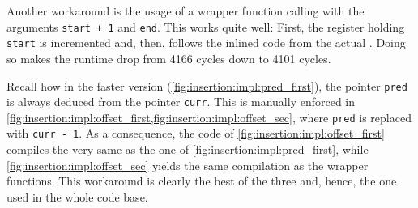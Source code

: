 Another workaround is the usage of a wrapper function calling \IS{} with the arguments \lstinline|start + 1| and \lstinline|end|.
This works quite well:
First, the register holding \lstinline|start| is incremented and, then, follows the inlined code from the actual \IS{}.
Doing so makes the runtime drop from 4166 cycles down to 4101 cycles.

Recall how in the faster version (\cref{fig:insertion:impl:pred_first}), the pointer \lstinline|pred| is always deduced from the pointer \lstinline|curr|.
This is manually enforced in \cref{fig:insertion:impl:offset_first,fig:insertion:impl:offset_sec}, where \lstinline|pred| is replaced with \lstinline|curr - 1|.
As a consequence, the code of \cref{fig:insertion:impl:offset_first} compiles the very same as the one of \cref{fig:insertion:impl:pred_first}, while \cref{fig:insertion:impl:offset_sec} yields the same compilation as the wrapper functions.
This workaround is clearly the best of the three and, hence, the one used in the whole code base.

